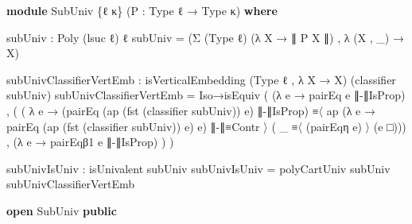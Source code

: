 \documentclass[
  11pt,
  oneside,
  article]{memoir}
\newenvironment{Shaded}{}{}
\newcommand{\KeywordTok}[1]{\textcolor[rgb]{0.00,0.44,0.13}{\textbf{#1}}}
\newcommand{\NormalTok}[1]{#1}
\newcommand{\OtherTok}[1]{\textcolor[rgb]{0.00,0.44,0.13}{#1}}
\theoremstyle{definition}
\theoremstyle{plain}
\newcommand{\0}{\textsf{0}}
\newcommand{\1}{\tn{\textsf{1}}}
\begin{document}
\begin{Shaded}
\begin{Highlighting}[]
\KeywordTok{module}\NormalTok{ SubUniv }\OtherTok{\{}\NormalTok{ℓ κ}\OtherTok{\}} \OtherTok{(}\NormalTok{P }\OtherTok{:}\NormalTok{ Type ℓ }\OtherTok{→}\NormalTok{ Type κ}\OtherTok{)} \KeywordTok{where}

\NormalTok{    subUniv }\OtherTok{:}\NormalTok{ Poly }\OtherTok{(}\NormalTok{lsuc ℓ}\OtherTok{)}\NormalTok{ ℓ}
\NormalTok{    subUniv }\OtherTok{=} \OtherTok{(}\NormalTok{Σ }\OtherTok{(}\NormalTok{Type ℓ}\OtherTok{)} \OtherTok{(λ}\NormalTok{ X }\OtherTok{→}\NormalTok{ ∥ P X ∥}\OtherTok{)}\NormalTok{ , }\OtherTok{λ} \OtherTok{(}\NormalTok{X , }\OtherTok{\_)} \OtherTok{→}\NormalTok{ X}\OtherTok{)}

\NormalTok{    subUnivClassifierVertEmb }\OtherTok{:}
\NormalTok{        isVerticalEmbedding }\OtherTok{(}\NormalTok{Type ℓ , }\OtherTok{λ}\NormalTok{ X }\OtherTok{→}\NormalTok{ X}\OtherTok{)} \OtherTok{(}\NormalTok{classifier subUniv}\OtherTok{)}
\NormalTok{    subUnivClassifierVertEmb }\OtherTok{=} 
\NormalTok{        Iso→isEquiv }
            \OtherTok{(} \OtherTok{(λ}\NormalTok{ e }\OtherTok{→}\NormalTok{ pairEq e ∥{-}∥IsProp}\OtherTok{)} 
\NormalTok{            , }\OtherTok{(} \OtherTok{(} \OtherTok{λ}\NormalTok{ e }\OtherTok{→} \OtherTok{(}\NormalTok{pairEq }\OtherTok{(}\NormalTok{ap }\OtherTok{(}\NormalTok{fst }\OtherTok{(}\NormalTok{classifier subUniv}\OtherTok{))}\NormalTok{ e}\OtherTok{)} 
\NormalTok{                                ∥{-}∥IsProp}\OtherTok{)} 
\NormalTok{                       ≡〈 ap }\OtherTok{(λ}\NormalTok{ e\textquotesingle{} }\OtherTok{→} 
\NormalTok{                                 pairEq }\OtherTok{(}\NormalTok{ap }\OtherTok{(}\NormalTok{fst }\OtherTok{(}\NormalTok{classifier subUniv}\OtherTok{))} 
\NormalTok{                                            e}\OtherTok{)}\NormalTok{ e\textquotesingle{}}\OtherTok{)} 
\NormalTok{                              ∥{-}∥≡Contr 〉 }\OtherTok{(} \OtherTok{\_} 
\NormalTok{                       ≡〈 }\OtherTok{(}\NormalTok{pairEqη e}\OtherTok{)}\NormalTok{ 〉 }
                       \OtherTok{(}\NormalTok{e □}\OtherTok{)))} 
\NormalTok{                , }\OtherTok{(λ}\NormalTok{ e }\OtherTok{→}\NormalTok{ pairEqβ1 e ∥{-}∥IsProp}\OtherTok{)} \OtherTok{)} \OtherTok{)}
    
\NormalTok{    subUnivIsUniv }\OtherTok{:}\NormalTok{ isUnivalent subUniv}
\NormalTok{    subUnivIsUniv }\OtherTok{=}\NormalTok{ polyCartUniv subUniv subUnivClassifierVertEmb}

\KeywordTok{open}\NormalTok{ SubUniv }\KeywordTok{public}
\end{Highlighting}
\end{Shaded}
\end{document}
